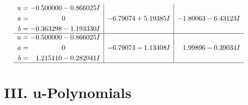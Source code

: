 \documentclass[1p]{elsarticle_modified}
\theoremstyle{definition}
\begin{document}
$$\begin{array}{c|c|c}
\begin{aligned}
u &= -0.500000 - 0.866025 I \\
a &= \phantom{-0.000000 } 0 \\
b &= -0.363298 - 1.193330 I\end{aligned}
 & -6.79074 + 5.19385 I & -1.80063 - 6.43123 I \\ \hline\begin{aligned}
u &= -0.500000 - 0.866025 I \\
a &= \phantom{-0.000000 } 0 \\
b &= \phantom{-}1.215110 - 0.282041 I\end{aligned}
 & -6.79074 - 1.13408 I & \phantom{-}1.99896 - 0.39034 I\\
 \hline 
 \end{array}$$\newpage
\newpage\renewcommand{\arraystretch}{1}
\centering \section*{ III. u-Polynomials}
\end{document}
